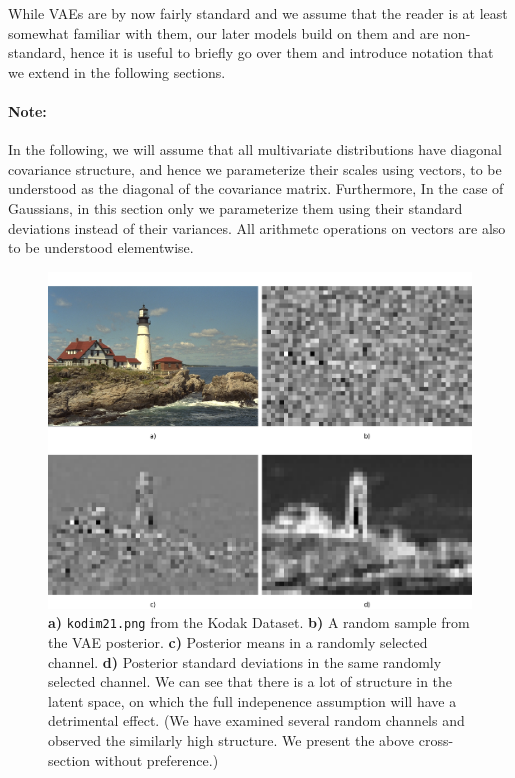 \par While VAEs are by now fairly standard and we assume that the reader is at
least somewhat familiar with them, our later models build on them and are
non-standard, hence it is useful to briefly go over them and introduce
notation that we extend in the following sections.


\paragraph{Note:} In the following, we will assume that all multivariate
distributions have diagonal covariance structure, and hence we
parameterize their scales using vectors, to be understood as the diagonal of the
covariance matrix. Furthermore, In the case of Gaussians, in this section only
we parameterize them using their standard deviations instead of their variances.
All arithmetc operations on vectors are also to be understood elementwise.

\begin{figure}
  \centering
  \includegraphics[width=\textwidth]{vae_rand_posterior.png}
  \caption{\textbf{a)} \texttt{kodim21.png} from the Kodak Dataset. \textbf{b)}
    A random sample from the VAE posterior. \textbf{c)} Posterior means in a
  randomly selected channel. \textbf{d)} Posterior standard deviations in the same
  randomly selected channel. We can see that there is a lot of structure in the
  latent space, on which the full indepenence assumption will have a detrimental
  effect. (We have examined several random channels and observed the
  similarly high structure. We present the above cross-section without preference.)}
  \label{fig:vae_rand_posterior}
\end{figure}

